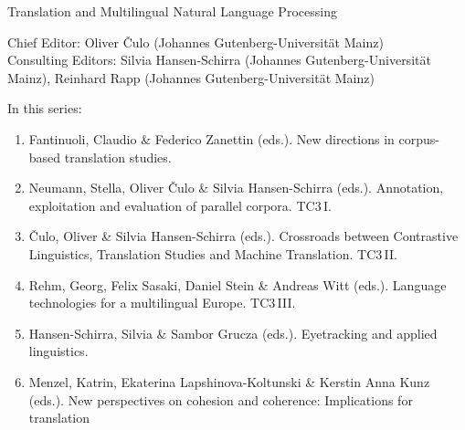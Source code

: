 {\large Translation and Multilingual Natural Language Processing}

\bigskip

Chief Editor: Oliver \v{C}ulo (Johannes Gutenberg-Universität Mainz) \\
Consulting Editors: Silvia Hansen-Schirra (Johannes Gutenberg-Universität Mainz), 
Reinhard Rapp (Johannes Gutenberg-Universität Mainz)

\bigskip

In this series:

\begin{enumerate}
\item Fantinuoli, Claudio \& Federico Zanettin (eds.). New directions in corpus-based translation studies.
\item Neumann, Stella, Oliver Čulo \& Silvia Hansen-Schirra (eds.). Annotation, exploitation and evaluation of parallel corpora. TC3\,I.
\item Čulo, Oliver  \& Silvia Hansen-Schirra (eds.). Crossroads between Contrastive Linguistics, Translation Studies and Machine Translation. TC3\,II.
\item Rehm, Georg, Felix Sasaki, Daniel Stein \& Andreas Witt (eds.). Language technologies for a multilingual Europe. TC3\,III.
\item Hansen-Schirra, Silvia \& Sambor Grucza (eds.). Eyetracking and applied linguistics.
\item Menzel, Katrin, Ekaterina Lapshinova-Koltunski \& Kerstin Anna Kunz  (eds.). New perspectives on cohesion and coherence: Implications for translation
\end{enumerate}

 
